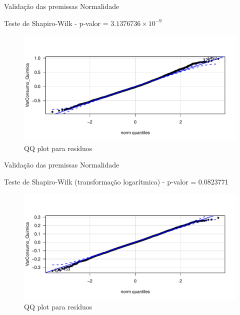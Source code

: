 \documentclass[
  ignorenonframetext,
]{beamer}
\begin{document}
\begin{frame}{Validação das premissas \textbar{} Normalidade}
\protect\hypertarget{validacao-das-premissas-normalidade}{}

Teste de Shapiro-Wilk - p-valor = \ensuremath{3.1376736\times 10^{-9}}

\begin{figure}

{\centering \includegraphics{apresentacao_final_files/figure-beamer/assum_norm-1} 

}

\caption{QQ plot para resíduos}\label{fig:assum_norm}
\end{figure}

\end{frame}

\begin{frame}{Validação das premissas \textbar{} Normalidade}
\protect\hypertarget{validacao-das-premissas-normalidade-1}{}

Teste de Shapiro-Wilk (transformação logarítmica) - p-valor = 0.0823771

\begin{figure}

{\centering \includegraphics{apresentacao_final_files/figure-beamer/assum_norm_log-1} 

}

\caption{QQ plot para resíduos}\label{fig:assum_norm_log}
\end{figure}

\end{frame}
\end{document}
